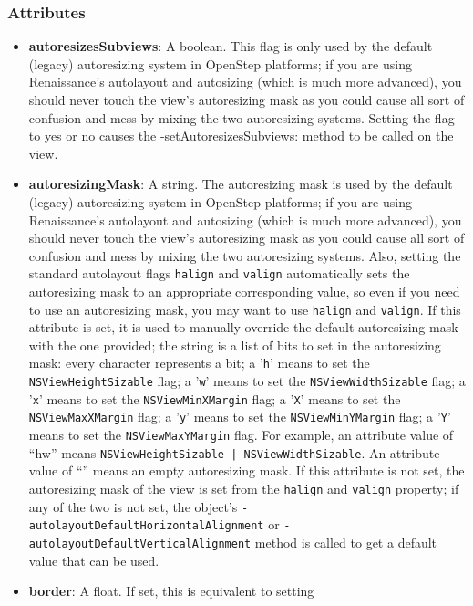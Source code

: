 \subsubsection{Attributes}
\begin{itemize}
\item {\bf autoresizesSubviews}: A boolean.  This flag is only used by
  the default (legacy) autoresizing system in OpenStep platforms; if
  you are using Renaissance's autolayout and autosizing (which is much
  more advanced), you should never touch the view's autoresizing mask
  as you could cause all sort of confusion and mess by mixing the two
  autoresizing systems.  Setting the flag to yes or no causes the
  -setAutoresizesSubviews: method to be called on the view.
\item {\bf autoresizingMask}: A string.  The autoresizing mask is used
  by the default (legacy) autoresizing system in OpenStep platforms;
  if you are using Renaissance's autolayout and autosizing (which is
  much more advanced), you should never touch the view's autoresizing
  mask as you could cause all sort of confusion and mess by mixing the
  two autoresizing systems.  Also, setting the standard autolayout
  flags \texttt{halign} and \texttt{valign} automatically sets the
  autoresizing mask to an appropriate corresponding value, so even if
  you need to use an autoresizing mask, you may want to use
  \texttt{halign} and \texttt{valign}.  If this attribute is
  set, it is used to manually override the default autoresizing mask
  with the one provided; the string is a list of bits to set in the
  autoresizing mask: every character represents a bit; a '\texttt{h}'
  means to set the \texttt{NSViewHeightSizable} flag; a '\texttt{w}'
  means to set the \texttt{NSViewWidthSizable} flag; a '\texttt{x}'
  means to set the \texttt{NSViewMinXMargin} flag; a '\texttt{X}'
  means to set the \texttt{NSViewMaxXMargin} flag; a '\texttt{y}'
  means to set the \texttt{NSViewMinYMargin} flag; a '\texttt{Y}'
  means to set the \texttt{NSViewMaxYMargin} flag.  For example, an
  attribute value of ``hw'' means \texttt{NSViewHeightSizable |
    NSViewWidthSizable}.  An attribute value of ``'' means an empty
  autoresizing mask.  If this attribute is not set, the autoresizing
  mask of the view is set from the \texttt{halign} and \texttt{valign}
  property; if any of the two is not set, the object's
  \texttt{-autolayoutDefaultHorizontalAlignment} or
  \texttt{-autolayoutDefaultVerticalAlignment} method is called to get
  a default value that can be used.
\item {\bf border}: A float.  If set, this is equivalent to setting

\end{itemize}
